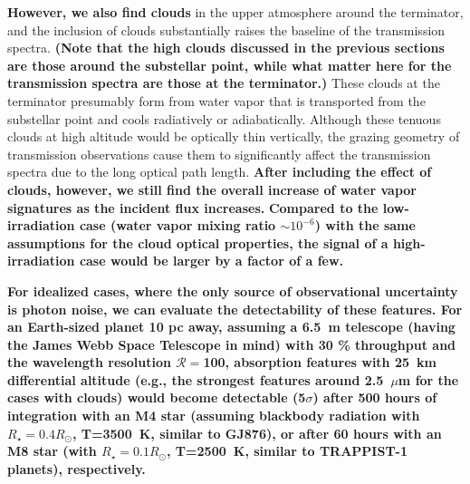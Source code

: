 \documentclass[11pt,numberedappendix,twocolappendix,]{emulateapj}
\def\wv{water vapor}
\def\revise#1{{\bf #1}}
\begin{document}
\revise{However, we also find clouds} in the upper atmosphere around the terminator, and the inclusion of clouds substantially raises the baseline of the transmission spectra. 
\revise{(Note that the high clouds discussed in the previous sections are those around the substellar point, while what matter here for the transmission spectra are those at the terminator.)} 
These clouds at the terminator presumably form from water vapor that is transported from the substellar point and cools radiatively or adiabatically. 
Although these tenuous clouds at high altitude would be optically thin vertically, the grazing geometry of transmission observations cause them to significantly affect the transmission spectra due to the long optical path length. 
\revise{After including the effect of clouds, however, we still find the overall increase of water vapor signatures as the incident flux increases. }
\revise{Compared to the low-irradiation case (\wv{} mixing ratio $\sim 10^{-6}$) with the same assumptions for the cloud optical properties, the signal of a high-irradiation case would be larger by a factor of a few. }

\revise{For idealized cases, where the only source of observational uncertainty is photon noise, we can evaluate the detectability of these features. For an Earth-sized planet 10 pc away, assuming a 6.5~m telescope (having the James Webb Space Telescope in mind) with 30 \% throughput and the wavelength resolution $\mathcal{R}=$100, absorption features with 25~km differential altitude (e.g., the strongest features around 2.5~$\mu$m for the cases with clouds) would become detectable (5$\sigma $) after 500 hours of integration with an M4 star (assuming blackbody radiation with $R_{\star }=0.4 R_{\odot }$, T=3500~K, similar to GJ876), or after 60 hours with an M8 star (with $R_{\star }=0.1 R_{\odot }$, T=2500~K, similar to TRAPPIST-1 planets), respectively. }
\end{document}
